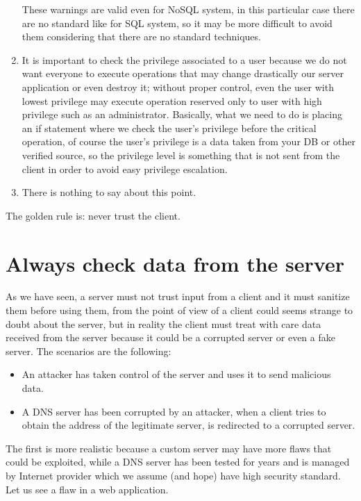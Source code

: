 \begin{enumerate}
	These warnings are valid even for NoSQL system, in this particular case there are no standard like for SQL system, so it may be more difficult to avoid them considering that there are no standard techniques.
	\item It is important to check the privilege associated to a user because we do not want everyone to execute operations that may change drastically our server application or even destroy it; without proper control, even the user with lowest privilege may execute operation reserved only to user with high privilege such as an administrator.
	Basically, what we need to do is placing an if statement where we check the user’s privilege before the critical operation, of course the user’s privilege is a data taken from your DB or other verified source, so the privilege level is something that is not sent from the client in order to avoid easy privilege escalation.
	\item There is nothing to say about this point.
\end{enumerate}

The golden rule is: never trust the client.

\section{Always check data from the server}
As we have seen, a server must not trust input from a client and it must sanitize them before using them, from the point of view of a client could seems strange to doubt about the server, but in reality the client must treat with care data received from the server because it could be a corrupted server or even a fake server.\newline
The scenarios are the following:
\begin{itemize}
	\item An attacker has taken control of the server and uses it to send malicious data.
	\item A DNS server has been corrupted by an attacker, when a client tries to obtain the address of the legitimate server, is redirected to
	a corrupted server.
\end{itemize}

The first is more realistic because a custom server may have more flaws that could be exploited, while a DNS server has been tested for years and is managed by Internet provider which we assume (and hope) have high security standard.\newline
Let us see a flaw in a web application.

